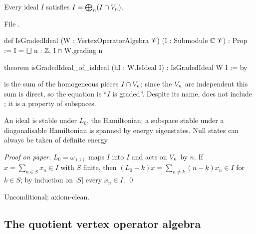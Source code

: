 \begin{theorem}\label{l04:thm:graded}
Every ideal $I$ satisfies $I = \bigoplus_n(I\cap V_n)$.
\end{theorem}
\noindent File .
\begin{leancode}
def IsGradedIdeal (W : VertexOperatorAlgebra 𝒱) (I : Submodule ℂ 𝒱) : Prop :=
  I = ⨆ n : ℤ, I ⊓ W.grading n

theorem isGradedIdeal_of_isIdeal (hI : W.IsIdeal I) : IsGradedIdeal W I := by
\end{leancode}
\begin{dictionary}
 is the sum of the homogeneous pieces $I\cap V_n$; since the
$V_n$ are independent this sum is direct, so the equation is ``$I$ is graded''. Despite its
name,  does not include ; it is a property of subspaces.
\end{dictionary}
\begin{physics}
An ideal is stable under $L_0$, the Hamiltonian; a subspace stable under a diagonalisable
Hamiltonian is spanned by energy eigenstates. Null states can always be taken of definite energy.
\end{physics}
\emph{Proof on paper.} $L_0 = \omega_{(1)}$ maps $I$ into $I$ and acts on $V_n$ by $n$. If $x =
\sum_{n\in S}x_n\in I$ with $S$ finite, then $(L_0-k)x = \sum_{n\ne k}(n-k)x_n\in I$ for $k\in S$;
by induction on $|S|$ every $x_n\in I$. \qed
\begin{status}
Unconditional; axiom-clean.
\end{status}

\subsection{The quotient vertex operator algebra}

